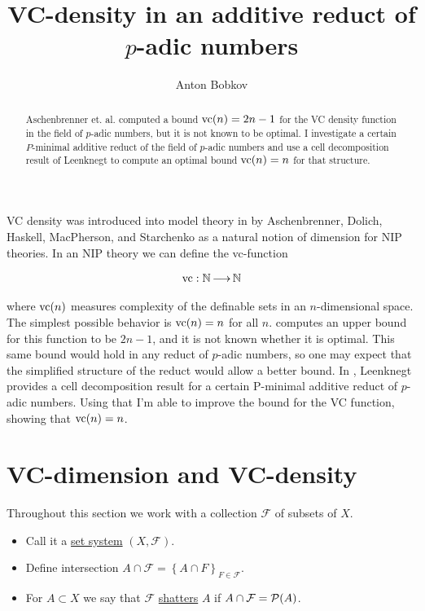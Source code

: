 \documentclass{amsart}
\title{VC-density in an additive reduct of $p$-adic numbers}
\author{Anton Bobkov}
\newcommand{\F}{\mathcal F}
\newcommand{\curly}[1]{\left\{#1\right\}}
\newcommand{\defn}{\underline}
\begin{document}
\begin{abstract}
  Aschenbrenner et. al. computed a bound $\operatorname{vc}(n) = 2n - 1$ for the VC density function in the field of $p$-adic numbers,
  but it is not known to be optimal.
  I investigate a certain $P$-minimal additive reduct of the field of $p$-adic numbers and
  use a cell decomposition result of Leenknegt to compute an optimal bound $\operatorname{vc}(n) = n$ for that structure.
\end{abstract}


\maketitle

VC density was introduced into model theory in \cite{density} by Aschenbrenner, Dolich, Haskell, MacPherson, and Starchenko
as a natural notion of dimension for NIP theories.
In an NIP theory we can define the vc-function

\begin{align*}
  \operatorname{vc} : \mathbb{N} \operatorname{\longrightarrow} \mathbb{N}
\end{align*}

where $\operatorname{vc}(n)$ measures complexity of the definable sets in an $n$-dimensional space.
The simplest possible behavior is $\operatorname{vc}(n) = n$ for all $n$.
\cite{density} computes an upper bound for this function to be $2n-1$, and it is not known whether it is optimal.
This same bound would hold in any reduct of $p$-adic numbers, so one may expect that the simplified structure of the reduct would allow a better bound.
In \cite{reduct}, Leenknegt provides a cell decomposition result for a certain P-minimal additive reduct of $p$-adic numbers.
Using that I'm able to improve the bound for the VC function, showing that $\operatorname{vc}(n) = n$.


\section{VC-dimension and VC-density}




\begin{Definition}
  Throughout this section we work with a collection $\F$ of subsets of $X$.
  \begin{itemize}
  \item Call it a \defn{set system} $(X, \F)$.
  \item Define intersection $A \cap \F = \curly{A \cap F}_{F\in \F}$.
  \item For $A \subset X$ we say that $\F$ \defn{shatters} $A$ if $A \cap \F = \PP(A)$.
  \end{itemize}    
\end{Definition}  
\end{document}
